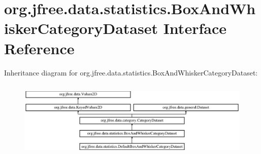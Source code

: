 \hypertarget{interfaceorg_1_1jfree_1_1data_1_1statistics_1_1_box_and_whisker_category_dataset}{}\section{org.\+jfree.\+data.\+statistics.\+Box\+And\+Whisker\+Category\+Dataset Interface Reference}
\label{interfaceorg_1_1jfree_1_1data_1_1statistics_1_1_box_and_whisker_category_dataset}
Inheritance diagram for org.\+jfree.\+data.\+statistics.\+Box\+And\+Whisker\+Category\+Dataset\+:\begin{figure}[H]
\begin{center}
\leavevmode
\includegraphics[height=3.733333cm]{interfaceorg_1_1jfree_1_1data_1_1statistics_1_1_box_and_whisker_category_dataset}
\end{center}
\end{figure}
